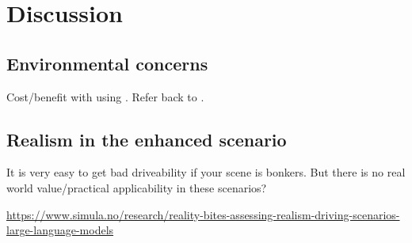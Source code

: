
\chapter{Discussion}
\section{Environmental concerns}
Cost/benefit with using . Refer back to .

\section{Realism in the enhanced scenario}

It is very easy to get bad driveability if your scene is bonkers. But there is no real world
value/practical applicability in these scenarios?

\url{https://www.simula.no/research/reality-bites-assessing-realism-driving-scenarios-large-language-models}